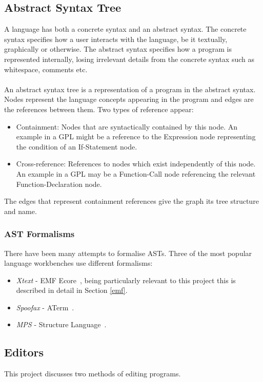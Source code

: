 \documentclass{article}
\begin{document}
\subsection{Abstract Syntax Tree}
A language has both a concrete syntax and an abstract syntax. The concrete syntax specifies how a user interacts with the language, be it textually, graphically or otherwise. The abstract syntax specifies how a program is represented internally, losing irrelevant details from the concrete syntax such as whitespace, comments etc.
\\
\\
An abstract syntax tree is a representation of a program in the abstract syntax. Nodes represent the language concepts appearing in the program and edges are the references between them. Two types of reference appear:
\begin{itemize}
\item Containment: Nodes that are syntactically contained by this node. An example in a GPL might be a reference to the Expression node representing the condition of an If-Statement node.
\item Cross-reference: References to nodes which exist independently of this node. An example in a GPL may be a Function-Call node referencing the relevant Function-Declaration node. 
\end{itemize}
The edges that represent containment references give the graph its tree structure and name.
\subsubsection{AST Formalisms}\label{astFormalisms}
There have been many attempts to formalise ASTs. Three of the most popular language workbenches use different formalisms: \begin{itemize}
\item \emph{Xtext} - EMF Ecore~\cite{emf}, being particularly relevant to this project this is described in detail in Section \ref{emf}.
\item \emph{Spoofax} - ATerm~\cite{aterm}.
\item \emph{MPS} - Structure Language~\cite{mpsStructureLanguage}.
\end{itemize}
%
\subsection{Editors}
This project discusses two methods of editing programs.
\end{document}
